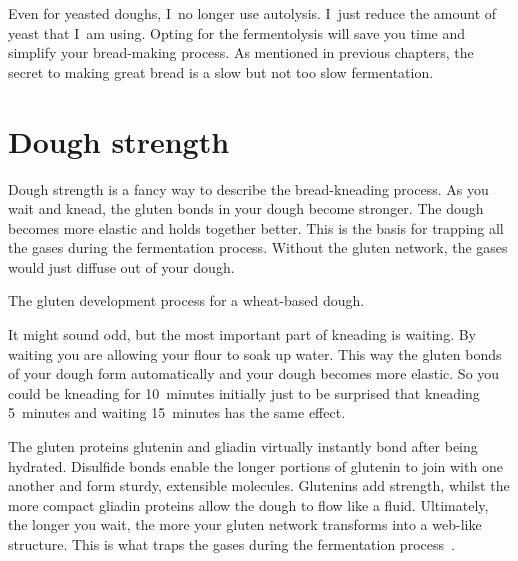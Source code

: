 Even for yeasted doughs, I~no longer use autolysis. I~just reduce the amount
of yeast that I~am using. Opting for the fermentolysis will
save you time and simplify your bread-making process. As mentioned in previous chapters,
the secret to making great bread is a slow but not too slow fermentation.

\section{Dough strength}

Dough strength is a fancy way to describe the bread-kneading process. As you wait and
knead, the gluten bonds in your dough become stronger. The dough
becomes more elastic and holds together better. This is the basis for trapping
all the gases during the fermentation process. Without the gluten network,
the gases would just diffuse out of your dough.

\begin{flowchart}[!htb]
\begin{center}
  
  \caption{The gluten development process for a wheat-based dough.}%
  \label{fig:wheat-sourdough-kneading-process}
\end{center}
\end{flowchart}

It might sound odd, but the most important part of kneading is waiting. By
waiting you are allowing your flour to soak up water. This way the gluten
bonds of your dough form automatically and your dough becomes more elastic.
So you could be kneading for 10~minutes initially just to be surprised
that kneading 5~minutes and waiting 15~minutes has the same effect.

The gluten proteins glutenin and gliadin virtually instantly bond after being
hydrated. Disulfide bonds enable the longer portions of
glutenin to join with one another and form sturdy, extensible molecules.
Glutenins add strength, whilst the more compact gliadin proteins allow
the dough to flow like a fluid. Ultimately, the longer you wait, the more
your gluten network transforms into a web-like structure. This is what
traps the gases during the fermentation process~\cite{how+does+gluten+work}.


